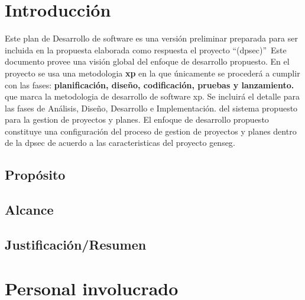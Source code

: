 \documentclass[12pt,a4paper]{article}
\begin{document}


\tableofcontents %
\listoffigures

\listoftables
\pagestyle{fancy} \mystyle \newpage %




\section{Introducción }
Este plan de Desarrollo de software es una versión preliminar preparada para ser incluida 
en la propuesta elaborada como respuesta el proyecto \textquotedblleft(\gls{dpsec})\textquotedblright \ Este documento
provee una visión global del enfoque de desarrollo propuesto.
\espacio
En el proyecto se usa una metodologia \textbf{\gls{xp}} en la que únicamente
se procederá a cumplir con las fases: \textbf{planificación, diseño, codificación, pruebas y lanzamiento.}
que marca la metodologia de desarrollo de software \gls{xp}.
Se incluirá el detalle para las fases de Análisis, Diseño, Desarrollo e Implementación.
del sistema propuesto para la gestion de proyectos y planes.
\espacio
El enfoque de desarrollo propuesto constituye una configuración del proceso
de gestion de proyectos y planes dentro de la \gls{dpsec} de acuerdo a las 
caracteristicas del proyecto \gls{genseg}.

\subsection{Propósito }

\subsection{Alcance}
 
\subsection{Justificación/Resumen}


\section{Personal involucrado}
\end{document}

